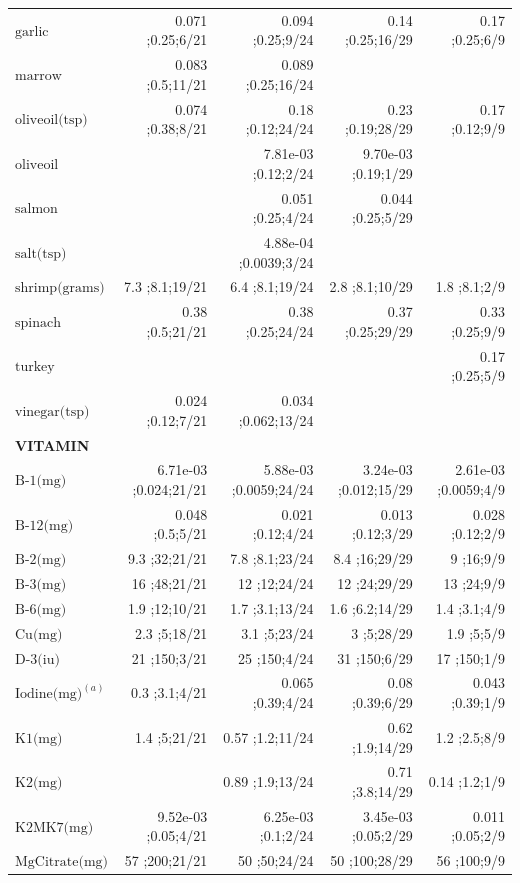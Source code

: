 \begin{table}[H]
\begin{tabular}{|l|r|r|r|r|}
$\textrm{garlic}$&0.071 ;0.25;6/21&0.094 ;0.25;9/24&0.14 ;0.25;16/29&0.17 ;0.25;6/9\\
$\textrm{marrow}$&0.083 ;0.5;11/21&0.089 ;0.25;16/24&&\\
$\textrm{oliveoil(tsp)}$&0.074 ;0.38;8/21&0.18 ;0.12;24/24&0.23 ;0.19;28/29&0.17 ;0.12;9/9\\
$\textrm{oliveoil}$&&7.81e-03 ;0.12;2/24&9.70e-03 ;0.19;1/29&\\
$\textrm{salmon}$&&0.051 ;0.25;4/24&0.044 ;0.25;5/29&\\
$\textrm{salt(tsp)}$&&4.88e-04 ;0.0039;3/24&&\\
$\textrm{shrimp(grams)}$&7.3 ;8.1;19/21&6.4 ;8.1;19/24&2.8 ;8.1;10/29&1.8 ;8.1;2/9\\
$\textrm{spinach}$&0.38 ;0.5;21/21&0.38 ;0.25;24/24&0.37 ;0.25;29/29&0.33 ;0.25;9/9\\
$\textrm{turkey}$&&&&0.17 ;0.25;5/9\\
$\textrm{vinegar(tsp)}$&0.024 ;0.12;7/21&0.034 ;0.062;13/24&&\\
{\bf VITAMIN}&&&&\\
$\textrm{B-1(mg)}$&6.71e-03 ;0.024;21/21&5.88e-03 ;0.0059;24/24&3.24e-03 ;0.012;15/29&2.61e-03 ;0.0059;4/9\\
$\textrm{B-12(mg)}$&0.048 ;0.5;5/21&0.021 ;0.12;4/24&0.013 ;0.12;3/29&0.028 ;0.12;2/9\\
$\textrm{B-2(mg)}$&9.3 ;32;21/21&7.8 ;8.1;23/24&8.4 ;16;29/29&9 ;16;9/9\\
$\textrm{B-3(mg)}$&16 ;48;21/21&12 ;12;24/24&12 ;24;29/29&13 ;24;9/9\\
$\textrm{B-6(mg)}$&1.9 ;12;10/21&1.7 ;3.1;13/24&1.6 ;6.2;14/29&1.4 ;3.1;4/9\\
$\textrm{Cu(mg)}$&2.3 ;5;18/21&3.1 ;5;23/24&3 ;5;28/29&1.9 ;5;5/9\\
$\textrm{D-3(iu)}$&21 ;150;3/21&25 ;150;4/24&31 ;150;6/29&17 ;150;1/9\\
$\textrm{Iodine(mg)}^{\left(a\right)}$&0.3 ;3.1;4/21&0.065 ;0.39;4/24&0.08 ;0.39;6/29&0.043 ;0.39;1/9\\
$\textrm{K1(mg)}$&1.4 ;5;21/21&0.57 ;1.2;11/24&0.62 ;1.9;14/29&1.2 ;2.5;8/9\\
$\textrm{K2(mg)}$&&0.89 ;1.9;13/24&0.71 ;3.8;14/29&0.14 ;1.2;1/9\\
$\textrm{K2MK7(mg)}$&9.52e-03 ;0.05;4/21&6.25e-03 ;0.1;2/24&3.45e-03 ;0.05;2/29&0.011 ;0.05;2/9\\
$\textrm{MgCitrate(mg)}$&57 ;200;21/21&50 ;50;24/24&50 ;100;28/29&56 ;100;9/9\\

\end{tabular}
\end{table}
